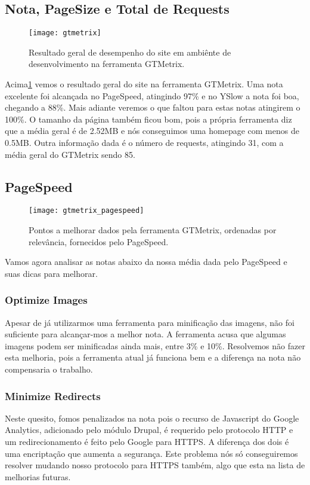 \subsection{Nota, PageSize e Total de Requests}

\begin{figure}[ht]
  \centering
  \texttt{[image: gtmetrix]}
  \caption{Resultado geral de desempenho do site em ambiênte de desenvolvimento na ferramenta GTMetrix.}
  \label{gtmetrix}
\end{figure}

Acima\ref{gtmetrix} vemos o resultado geral do site na ferramenta GTMetrix. Uma nota excelente foi alcançada no PageSpeed, atingindo 97\% e no YSlow a nota foi boa, chegando a 88\%. Mais adiante veremos o que faltou para estas notas atingirem o 100\%. O tamanho da página também ficou bom, pois a própria ferramenta diz que a média geral é de 2.52MB e nós conseguimos uma homepage com menos de 0.5MB. Outra informação dada é o número de requests, atingindo 31, com a média geral do GTMetrix sendo 85.

\subsection{PageSpeed}

\begin{figure}[ht]
  \centering
  \texttt{[image: gtmetrix\_pagespeed]}
  \caption{Pontos a melhorar dados pela ferramenta GTMetrix, ordenadas por relevância, fornecidos pelo PageSpeed.}
  \label{gtmetrix_pagespeed}
\end{figure}

Vamos agora analisar as notas abaixo da nossa média dada pelo PageSpeed e suas dicas para melhorar.

\subsubsection{Optimize Images}
Apesar de já utilizarmos uma ferramenta para minificação das imagens, não foi suficiente para alcançar-mos a melhor nota. A ferramenta acusa que algumas imagens podem ser minificadas ainda mais, entre 3\% e 10\%. Resolvemos não fazer esta melhoria, pois a ferramenta atual já funciona bem e a diferença na nota não compensaria o trabalho.

\subsubsection{Minimize Redirects}
Neste quesito, fomos penalizados na nota pois o recurso de Javascript do Google Analytics, adicionado pelo módulo Drupal, é requerido pelo protocolo HTTP e um redirecionamento é feito pelo Google para HTTPS. A diferença dos dois é uma encriptação que aumenta a segurança. Este problema nós só conseguiremos resolver mudando nosso protocolo para HTTPS também, algo que esta na lista de melhorias futuras.

